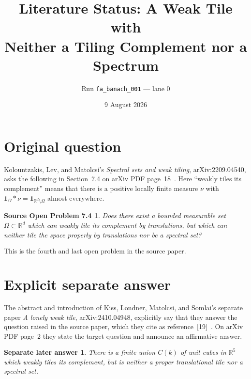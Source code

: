 \documentclass[11pt]{article}
\title{Literature Status: A Weak Tile with\\
Neither a Tiling Complement nor a Spectrum}
\author{Run \texttt{fa\_banach\_001} --- lane 0}
\date{9 August 2026}
\newtheorem*{question}{Source Open Problem 7.4}
\newtheorem*{answer}{Separate later answer}
\begin{document}
\maketitle

\begin{center}
\end{center}

\section{Original question}

Kolountzakis, Lev, and Matolcsi's \emph{Spectral sets and weak tiling},
arXiv:2209.04540, asks the following in Section~7.4 on arXiv PDF
page~18~\cite{source}.  Here ``weakly tiles its complement'' means that
there is a positive locally finite measure $\nu$ with
$\mathbf 1_\Omega*\nu=\mathbf 1_{\mathbb R^d\setminus\Omega}$ almost
everywhere.

\begin{question}
Does there exist a bounded measurable set $\Omega\subset\mathbb R^d$
which can weakly tile its complement by translations, but which can neither
tile the space properly by translations nor be a spectral set?
\end{question}

This is the fourth and last open problem in the source paper.

\section{Explicit separate answer}

The abstract and introduction of Kiss, Londner, Matolcsi, and Somlai's
separate paper \emph{A lonely weak tile}, arXiv:2410.04948, explicitly say
that they answer the question raised in the source paper, which they cite as
reference~[19]~\cite{answerpaper}.  On arXiv PDF page~2 they state the target
question and announce an affirmative answer.

\begin{answer}
There is a finite union $C(k)$ of unit cubes in $\mathbb R^5$ which weakly
tiles its complement, but is neither a proper translational tile nor a
spectral set.
\end{answer}
\end{document}
